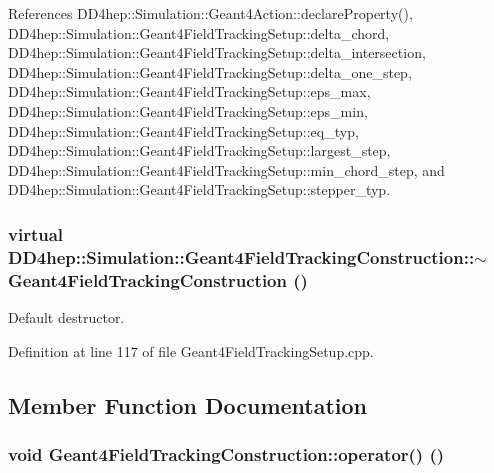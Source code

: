 References DD4hep::Simulation::Geant4Action::declareProperty(), DD4hep::Simulation::Geant4FieldTrackingSetup::delta\_\-chord, DD4hep::Simulation::Geant4FieldTrackingSetup::delta\_\-intersection, DD4hep::Simulation::Geant4FieldTrackingSetup::delta\_\-one\_\-step, DD4hep::Simulation::Geant4FieldTrackingSetup::eps\_\-max, DD4hep::Simulation::Geant4FieldTrackingSetup::eps\_\-min, DD4hep::Simulation::Geant4FieldTrackingSetup::eq\_\-typ, DD4hep::Simulation::Geant4FieldTrackingSetup::largest\_\-step, DD4hep::Simulation::Geant4FieldTrackingSetup::min\_\-chord\_\-step, and DD4hep::Simulation::Geant4FieldTrackingSetup::stepper\_\-typ.\hypertarget{class_d_d4hep_1_1_simulation_1_1_geant4_field_tracking_construction_a3c5e7faf98ffa659094ac4f18dd5d1e2}{
\subsubsection[{$\sim$Geant4FieldTrackingConstruction}]{\setlength{\rightskip}{0pt plus 5cm}virtual DD4hep::Simulation::Geant4FieldTrackingConstruction::$\sim$Geant4FieldTrackingConstruction ()}}
\label{class_d_d4hep_1_1_simulation_1_1_geant4_field_tracking_construction_a3c5e7faf98ffa659094ac4f18dd5d1e2}


Default destructor. 

Definition at line 117 of file Geant4FieldTrackingSetup.cpp.

\subsection{Member Function Documentation}
\hypertarget{class_d_d4hep_1_1_simulation_1_1_geant4_field_tracking_construction_adcd59c071e92490f8fd37423d74f542a}{
\subsubsection[{operator()}]{\setlength{\rightskip}{0pt plus 5cm}void Geant4FieldTrackingConstruction::operator() ()}}
\label{class_d_d4hep_1_1_simulation_1_1_geant4_field_tracking_construction_adcd59c071e92490f8fd37423d74f542a}


